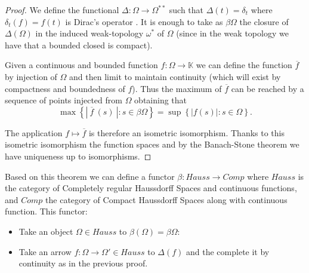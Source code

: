 \begin{example}
\begin{itemize}
\begin{remark}
    \end{remark}
    \begin{proof}
      We define the functional $\Delta: \Omega \to \Omega^{**}$   such that $\Delta(t)=\delta_t$ where $\delta_t(f) = f(t)$ is Dirac's operator .  It is enough to take as $\beta \Omega$ the closure of $\Delta(\Omega)$ in the induced weak-topology $\omega^*$ of $\Omega$ (since in the weak topology we have that a bounded closed is compact).  
      
      Given a continuous and bounded function $f:\Omega \to\mathbb K$ we can define the function $\overline{f}$ by injection of $\Omega$ and then limit to maintain continuity (which will exist by compactness and boundedness of $f$). Thus the maximum of $\overline{f}$ can be reached by a sequence of points injected from  $\Omega$ obtaining that   
      $${\displaystyle\max\left\{|\ \overline{f}\ (s)\ | : s \in \beta\Omega\right\} = \sup\left\{| f(s) |: s \in \Omega\right\}}.$$
      
      The application $f \mapsto \overline{f}$ is therefore an isometric isomorphism. Thanks to this isometric isomorphism the function spaces and by the Banach-Stone theorem\cite[Theorem 3]{banach1932theorie} we have uniqueness up to isomorphisms. 
    \end{proof}

    Based on this theorem we can define a functor  $\beta:Hauss \to Comp$ where $Hauss$ is the category of Completely regular Haussdorff  Spaces and continuous functions, and $Comp$ the category of Compact Haussdorff Spaces along with continuous function. This functor:
    \begin{itemize}
    \item Take an object $\Omega \in Hauss$ to $\beta(\Omega) = \beta\Omega$:
    \item Take an arrow $f:\Omega \to \Omega'\in Hauss$ to $\Delta(f)$ and the complete it by continuity as in the previous proof.
    \end{itemize}
    




\end{itemize}
\end{example}
